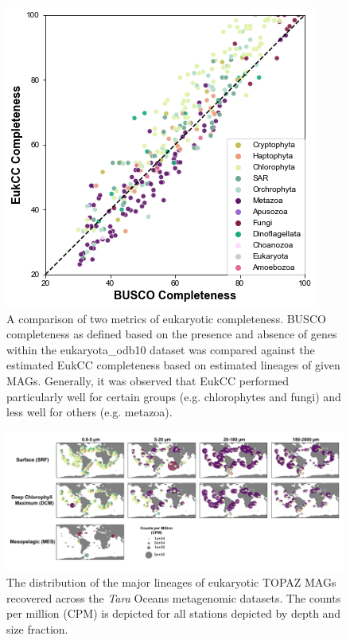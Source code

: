 \documentclass[12pt]{article}
\numberwithin{equation}{section}
\begin{document}
\begin{figure}
    \centering
    \includegraphics[width=0.6\columnwidth]{si-figures/HQ_BUSCO-EukCC-comp.png}
    \caption{A comparison of two metrics of eukaryotic completeness. BUSCO completeness as defined based on the presence and absence of genes within the eukaryota\_odb10 dataset was compared against the estimated EukCC completeness based on estimated lineages of given MAGs. Generally, it was observed that EukCC performed particularly well for certain groups (e.g. chlorophytes and fungi) and less well for others (e.g. metazoa).}
    \label{fig:eukcc}
\end{figure}


\begin{landscape}
\begin{figure}
    \centering
    \includegraphics[width=0.95\columnwidth]{si-figures/Distribution-Map-Taxonomy-01.png}
    \caption{The distribution of the major lineages of eukaryotic TOPAZ MAGs recovered across the \textit{Tara} Oceans metagenomic datasets. The counts per million (CPM) is depicted for all stations depicted by depth and size fraction.  }
    \label{fig:map}
\end{figure}
\end{landscape}
\end{document}
